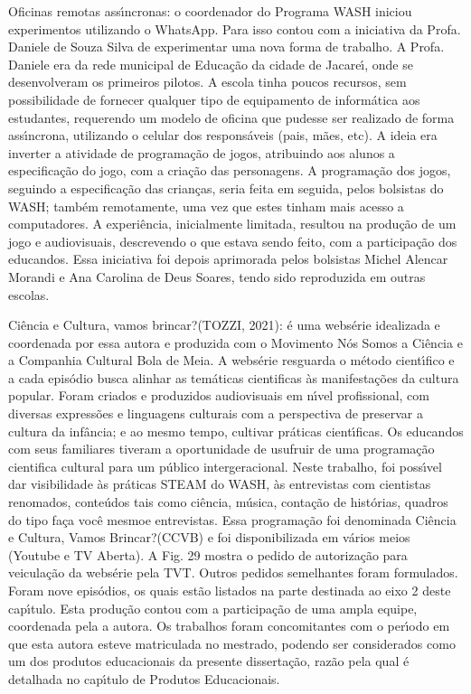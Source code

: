 \documentclass[
12pt,		%
openright,	%
twoside,  %
a4paper,			%
chapter=TITLE,		%
english,			%
french,				%
spanish,			%
brazil				%
]{USPSC-classe/USPSC}
\begin{document}
\begin{alineas}
\item Oficinas remotas ass\'{\i}ncronas: o coordenador do Programa WASH iniciou experimentos utilizando o WhatsApp. Para isso contou com a iniciativa da Profa. Daniele de Souza Silva de experimentar uma nova forma de trabalho. A Profa. Daniele era da rede municipal de Educa\c{c}\~ao da cidade de Jacare\'{\i}, onde se desenvolveram os primeiros pilotos. A escola tinha poucos recursos, sem possibilidade de fornecer qualquer tipo de equipamento de inform\'atica aos estudantes, requerendo um modelo de oficina que pudesse ser realizado de forma ass\'{\i}ncrona, utilizando o celular dos respons\'aveis (pais, m\~aes, etc). A ideia era inverter a atividade de programa\c{c}\~ao de jogos, atribuindo aos alunos a especifica\c{c}\~ao do jogo, com a cria\c{c}\~ao das personagens. A programa\c{c}\~ao dos jogos, seguindo a especifica\c{c}\~ao das crian\c{c}as, seria feita em seguida, pelos bolsistas do WASH; tamb\'em remotamente, uma vez que estes tinham mais acesso a computadores. A experi\^encia, inicialmente limitada, resultou na produ\c{c}\~ao de um jogo e audiovisuais, descrevendo o que estava sendo feito, com a participa\c{c}\~ao dos educandos. Essa iniciativa foi depois aprimorada pelos bolsistas Michel Alencar Morandi e Ana Carolina de Deus Soares, tendo sido reproduzida em outras escolas.
\item \textquotedbl Ci\^encia e Cultura, vamos brincar?\textquotedbl   (TOZZI, 2021): \'e uma webs\'erie idealizada  e coordenada por essa  autora e produzida com o Movimento N\'os Somos a Ci\^encia e a Companhia Cultural Bola de Meia. A webs\'erie resguarda o m\'etodo cient\'{\i}fico e a cada epis\'odio  busca  alinhar as tem\'aticas cientificas \`as manifesta\c{c}\~oes  da cultura popular.  Foram criados e produzidos audiovisuais em n\'{\i}vel profissional, com diversas express\~oes e linguagens culturais  com a perspectiva de preservar a cultura da inf\^ancia; e ao mesmo tempo,  cultivar pr\'aticas cient\'{\i}ficas.  Os educandos com seus familiares tiveram a oportunidade de usufruir de uma programa\c{c}\~ao cientifica cultural para um p\'ublico 
intergeracional. Neste trabalho, foi poss\'{\i}vel dar visibilidade \`as pr\'aticas STEAM do WASH,  \`as entrevistas com cientistas renomados, conte\'udos tais como ci\^encia, m\'usica, conta\c{c}\~ao de hist\'orias, quadros do tipo \textquotedbl fa\c{c}a voc\^e mesmo\textquotedbl  e entrevistas. Essa programa\c{c}\~ao foi denominada \textquotedbl Ci\^encia e Cultura, Vamos Brincar?\textquotedbl  (CCVB) e foi disponibilizada em v\'arios meios (Youtube e TV Aberta). A Fig. 29 mostra o pedido de autoriza\c{c}\~ao para veicula\c{c}\~ao da webs\'erie pela TVT. Outros pedidos semelhantes foram formulados. Foram nove epis\'odios, os quais est\~ao listados na parte destinada ao eixo 2 deste cap\'{\i}tulo. Esta produ\c{c}\~ao contou com a participa\c{c}\~ao de uma ampla equipe, coordenada pela a autora. Os trabalhos foram concomitantes com o per\'{\i}odo em que esta autora esteve matriculada no mestrado, podendo ser considerados como um dos produtos educacionais da presente disserta\c{c}\~ao, raz\~ao pela qual \'e detalhada no cap\'{\i}tulo de Produtos Educacionais.
\end{alineas}
\end{document}
